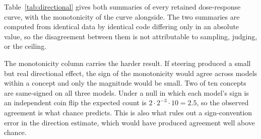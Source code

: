 \documentclass{article}
\begin{document}
Table~\ref{tab:directional} gives both summaries of every retained dose-response
curve, with the monotonicity of the curve alongside. The two summaries are
computed from identical data by identical code differing only in an absolute
value, so the disagreement between them is not attributable to sampling,
judging, or the ceiling.

The monotonicity column carries the harder result. If steering produced a small
but real directional effect, the sign of the monotonicity would agree across
models within a concept and only the magnitude would be small. Two of ten
concepts are same-signed on all three models. Under a null in which each model's
sign is an independent coin flip the expected count is $2 \cdot 2^{-3} \cdot 10 =
2.5$, so the observed agreement is what chance predicts. This is also what rules
out a sign-convention error in the direction estimate, which would have produced
agreement well above chance.
\end{document}
